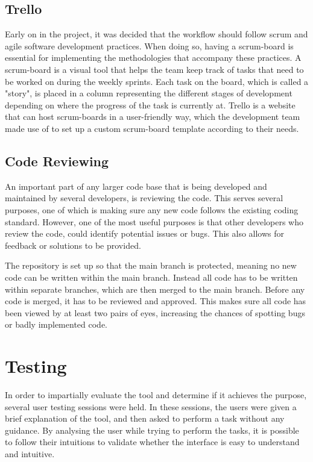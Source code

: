     \subsection{Trello}
        Early on in the project, it was decided that the workflow should follow scrum and agile software development practices. When doing so, having a scrum-board is essential for implementing the methodologies that accompany these practices. A scrum-board is a visual tool that helps the team keep track of tasks that need to be worked on during the weekly sprints. Each task on the board, which is called a "story", is placed in a column representing the different stages of development depending on where the progress of the task is currently at. Trello is a website that can host scrum-boards in a user-friendly way, which the development team made use of to set up a custom scrum-board template according to their needs\cite{trello}.


    \subsection{Code Reviewing} \label{sub:code-reviewing}
        An important part of any larger code base that is being developed and maintained by several developers, is reviewing the code. This serves several purposes, one of which is making sure any new code follows the existing coding standard. However, one of the most useful purposes is that other developers who review the code, could identify potential issues or bugs. This also allows for feedback or solutions to be provided.

        The repository is set up so that the main branch is protected, meaning no new code can be written within the main branch. Instead all code has to be written within separate branches, which are then merged to the main branch. Before any code is merged, it has to be reviewed and approved. This makes sure all code has been viewed by at least two pairs of eyes, increasing the chances of spotting bugs or badly implemented code.

\section{Testing}
    In order to impartially evaluate the tool and determine if it achieves the purpose, several user testing sessions were held. In these sessions, the users were given a brief explanation of the tool, and then asked to perform a task without any guidance. By analysing the user while trying to perform the tasks, it is possible to follow their intuitions to validate whether the interface is easy to understand and intuitive.

